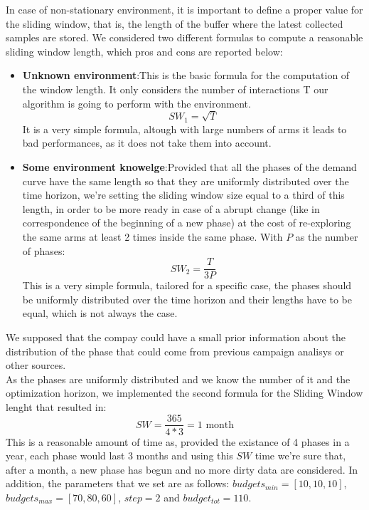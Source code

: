 In case of non-stationary environment, it is important to define a
proper value for the sliding window, that is, the length of the buffer where the latest
collected samples are stored. We considered two different formulas to compute a
reasonable sliding window length, which pros and cons are reported below:

\begin{itemize}
	\item \textbf{Unknown environment}:\@  This is the basic formula for the computation of the window length. It only considers the number of interactions T our algorithm is going to perform
	with the environment.
	$$SW_1 = \sqrt{T}$$
	It is a very simple formula, altough with large numbers of arms it leads to bad performances, as it does not take them into account.
	
	\item \textbf{Some environment knowelge}:\@  Provided that all the phases of the demand curve have the same length so that they are uniformly distributed over the time horizon, we’re setting the sliding window size equal to a third of this length, in order to be more ready in case of a abrupt change (like in correspondence of the beginning
	of a new phase) at the cost of re-exploring the same arms at least 2 times inside the same phase. With $P$ as the number of phases:
	$$SW_2 = \dfrac{T}{3P}$$
	This is a very simple formula, tailored for a specific case, the phases should be uniformly distributed over the time horizon
	and their lengths have to be equal, which is not always the case.	
\end{itemize} 

We supposed that the compay could have a small prior information about the distribution of the phase that could come from previous campaign analisys or other sources.
\\As the phases are uniformly distributed and we know the number of it and the optimization horizon, we implemented the second formula for the Sliding Window lenght that resulted in:
$$SW = \dfrac{365}{4*3} = 1 \text{ month}$$
This is a reasonable amount of time as, provided the existance of 4 phases in a year, each phase would last 3 months and using this $SW$ time we're sure that, after a month, a new phase has begun and no more dirty data are considered.
In addition, the parameters that we set are as follows:
$budgets_{min} = [10, 10, 10]$, $budgets_{max} = [70, 80, 60]$, $step = 2$ and $budget_{tot} = 110$.